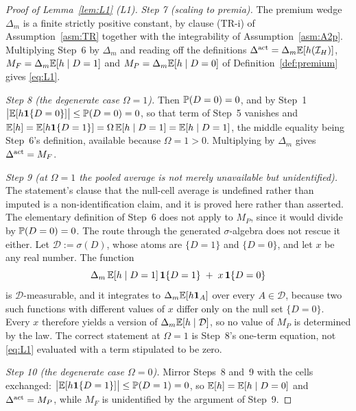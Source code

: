 \begin{proof}[Proof of Lemma~\ref{lem:L1} (L1)]
\emph{Step 7 (scaling to premia).} The premium wedge $\Delta_m$ is a finite strictly positive
constant, by clause (TR-i) of Assumption~\ref{asm:TR} together with the integrability of
Assumption~\ref{asm:A2p}. Multiplying Step~6 by $\Delta_m$ and reading off the definitions
$\Delta^{\mathrm{act}} = \Delta_m\mathbb{E}[h(\mathcal I_H)]$, $M_F = \Delta_m\mathbb{E}[h \mid D=1]$ and
$M_P = \Delta_m\mathbb{E}[h \mid D=0]$ of Definition~\ref{def:premium} gives \eqref{eq:L1}.

\emph{Step 8 (the degenerate case $\Omega = 1$).} Then $\mathbb{P}(D=0) = 0$, and by Step~1
$\bigl|\mathbb{E}[h\mathbf{1}\{D=0\}]\bigr| \le \mathbb{P}(D=0) = 0$, so that term of Step~5 vanishes and
$\mathbb{E}[h] = \mathbb{E}[h\mathbf{1}\{D=1\}] = \Omega\,\mathbb{E}[h \mid D=1] = \mathbb{E}[h \mid D=1]$, the middle equality
being Step~6's definition, available because $\Omega = 1 > 0$. Multiplying by $\Delta_m$ gives
$\Delta^{\mathrm{act}} = M_F$.

\emph{Step 9 (at $\Omega=1$ the pooled average is not merely unavailable but unidentified).} The
statement's clause that the null-cell average is undefined rather than imputed is a
non-identification claim, and it is proved here rather than asserted. The elementary definition of
Step~6 does not apply to $M_P$, since it would divide by $\mathbb{P}(D=0)=0$. The route through the
generated $\sigma$-algebra does not rescue it either. Let $\mathcal D := \sigma(D)$, whose atoms are
$\{D=1\}$ and $\{D=0\}$, and let $x$ be any real number. The function
\begin{equation}
\label{eq:L1-version}
\Delta_m\,\mathbb{E}[h \mid D=1]\,\mathbf{1}\{D=1\} \;+\; x\,\mathbf{1}\{D=0\}
\end{equation}
is $\mathcal D$-measurable, and it integrates to $\Delta_m\mathbb{E}[h\mathbf{1}_A]$ over every $A \in \mathcal
D$, because two such functions with different values of $x$ differ only on the null set $\{D=0\}$.
Every $x$ therefore yields a version of $\Delta_m\mathbb{E}[h \mid \mathcal D]$, so no value of $M_P$ is
determined by the law. The correct statement at $\Omega=1$ is Step~8's one-term equation, not
\eqref{eq:L1} evaluated with a term stipulated to be zero.

\emph{Step 10 (the degenerate case $\Omega = 0$).} Mirror Steps~8 and~9 with the cells exchanged:
$\bigl|\mathbb{E}[h\mathbf{1}\{D=1\}]\bigr| \le \mathbb{P}(D=1) = 0$, so $\mathbb{E}[h] = \mathbb{E}[h \mid D=0]$ and
$\Delta^{\mathrm{act}} = M_P$, while $M_F$ is unidentified by the argument of Step~9.


\end{proof}
